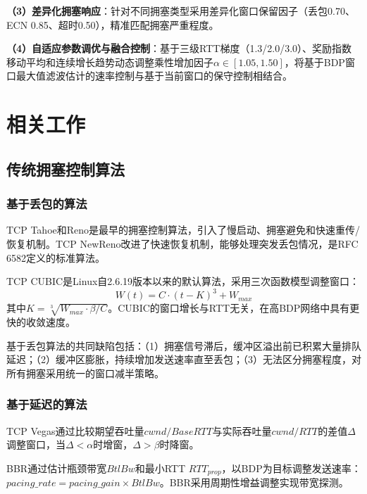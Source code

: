 \documentclass[10pt,twocolumn]{article}
\begin{document}
\textbf{（3）差异化拥塞响应}：针对不同拥塞类型采用差异化窗口保留因子（丢包0.70、ECN 0.85、超时0.50），精准匹配拥塞严重程度。

\textbf{（4）自适应参数调优与融合控制}：基于三级RTT梯度（1.3/2.0/3.0）、奖励指数移动平均和连续增长趋势动态调整乘性增加因子$\alpha \in [1.05, 1.50]$，将基于BDP窗口最大值滤波估计的速率控制与基于当前窗口的保守控制相结合。


\section{相关工作}

\subsection{传统拥塞控制算法}

\subsubsection{基于丢包的算法}

TCP Tahoe和Reno是最早的拥塞控制算法\cite{jacobson1988}，引入了慢启动、拥塞避免和快速重传/恢复机制。TCP NewReno\cite{newreno}改进了快速恢复机制，能够处理突发丢包情况，是RFC 6582定义的标准算法。

TCP CUBIC\cite{cubic}是Linux自2.6.19版本以来的默认算法，采用三次函数模型调整窗口：
\begin{equation}
W(t) = C \cdot (t - K)^3 + W_{max}
\end{equation}
其中$K = \sqrt[3]{W_{max} \cdot \beta / C}$。CUBIC的窗口增长与RTT无关，在高BDP网络中具有更快的收敛速度。

基于丢包算法的共同缺陷包括：（1）拥塞信号滞后，缓冲区溢出前已积累大量排队延迟；（2）缓冲区膨胀，持续增加发送速率直至丢包；（3）无法区分拥塞程度，对所有拥塞采用统一的窗口减半策略。

\subsubsection{基于延迟的算法}

TCP Vegas\cite{vegas}通过比较期望吞吐量$cwnd/BaseRTT$与实际吞吐量$cwnd/RTT$的差值$\Delta$调整窗口，当$\Delta < \alpha$时增窗，$\Delta > \beta$时降窗。

BBR\cite{bbr}通过估计瓶颈带宽$BtlBw$和最小RTT $RTT_{prop}$，以BDP为目标调整发送速率：$pacing\_rate = pacing\_gain \times BtlBw$。BBR采用周期性增益调整实现带宽探测。
\end{document}

